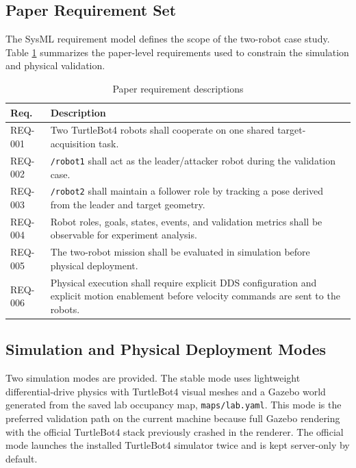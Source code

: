 \documentclass{ieeeaccess}
\begin{document}
\subsection{Paper Requirement Set}
The SysML requirement model defines the scope of the two-robot case study. Table \ref{tab_traceability} summarizes the paper-level requirements used to constrain the simulation and physical validation.

\begin{table}[H]
\caption{Paper requirement descriptions}
\label{tab_traceability}
\centering
\begin{tabular}{p{}p{}}
\hline
\textbf{Req.} & \textbf{Description} \\
\hline
REQ-001 & Two TurtleBot4 robots shall cooperate on one shared target-acquisition task. \\
REQ-002 & \texttt{/robot1} shall act as the leader/attacker robot during the validation case. \\
REQ-003 & \texttt{/robot2} shall maintain a follower role by tracking a pose derived from the leader and target geometry. \\
REQ-004 & Robot roles, goals, states, events, and validation metrics shall be observable for experiment analysis. \\
REQ-005 & The two-robot mission shall be evaluated in simulation before physical deployment. \\
REQ-006 & Physical execution shall require explicit DDS configuration and explicit motion enablement before velocity commands are sent to the robots. \\
\hline
\end{tabular}
\end{table}

\subsection{Simulation and Physical Deployment Modes}
Two simulation modes are provided. The stable mode uses lightweight differential-drive physics with TurtleBot4 visual meshes and a Gazebo world generated from the saved lab occupancy map, \texttt{maps/lab.yaml}. This mode is the preferred validation path on the current machine because full Gazebo rendering with the official TurtleBot4 stack previously crashed in the renderer. The official mode launches the installed TurtleBot4 simulator twice and is kept server-only by default.
\end{document}
